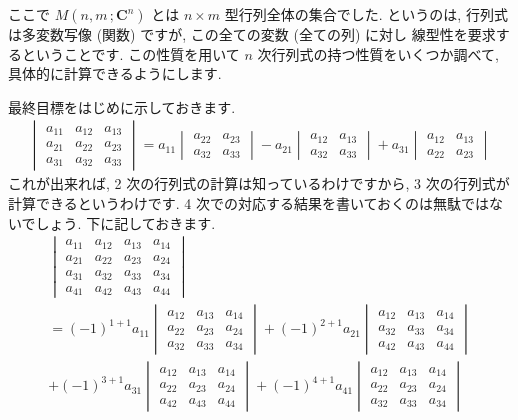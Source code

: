 \documentclass[openany, a4paper, oneside]{book}
\theoremstyle{break}
\theoremstyle{breakdefn}
\begin{document}
ここで $M \left ( n,m \, ; \bm{C}^n \right)$ とは $n \times m$ 型行列全体の集合でした.
というのは,
行列式は多変数写像 (関数) ですが, この全ての変数 (全ての列) に対し
線型性を要求するということです.
この性質を用いて $n$ 次行列式の持つ性質をいくつか調べて, 具体的に計算できるようにします.

最終目標をはじめに示しておきます.
\begin{align}
 \begin{vmatrix} a_{11} & a_{12} & a_{13} \\
  a_{21} & a_{22} & a_{23} \\
  a_{31} & a_{32} & a_{33}
 \end{vmatrix}
 =
 a_{11}
 \begin{vmatrix} a_{22} & a_{23} \\
  a_{32} & a_{33}
 \end{vmatrix}
 -a_{21}
 \begin{vmatrix}
  a_{12} & a_{13} \\
  a_{32} & a_{33}
 \end{vmatrix}
 +a_{31}
 \begin{vmatrix}
  a_{12} & a_{13} \\
  a_{22} & a_{23}
 \end{vmatrix}
\end{align}
これが出来れば, 2 次の行列式の計算は知っているわけですから, 3 次の行列式が計算できるというわけです.
4 次での対応する結果を書いておくのは無駄ではないでしょう. 下に記しておきます.
\begin{gather}
 \begin{vmatrix} a_{11} & a_{12} & a_{13} & a_{14} \\
 a_{21} & a_{22} & a_{23} & a_{24} \\
 a_{31} & a_{32} & a_{33} & a_{34} \\
 a_{41} & a_{42} & a_{43} & a_{44}
 \end{vmatrix}\\
 =
 (-1)^{1+1}a_{11}
 \begin{vmatrix} a_{12} & a_{13} & a_{14} \\
 a_{22} & a_{23} & a_{24} \\
 a_{32} & a_{33} & a_{34}
 \end{vmatrix}
 +(-1)^{2+1}a_{21}
 \begin{vmatrix}
 a_{12} & a_{13} & a_{14} \\
 a_{32} & a_{33} & a_{34} \\
 a_{42} & a_{43} & a_{44}
 \end{vmatrix} \\
 +(-1)^{3+1}a_{31}
 \begin{vmatrix}
 a_{12} & a_{13} & a_{14} \\
 a_{22} & a_{23} & a_{24} \\
 a_{42} & a_{43} & a_{44}
 \end{vmatrix}
 +(-1)^{4+1}a_{41}
 \begin{vmatrix} a_{12} & a_{13} & a_{14} \\
 a_{22} & a_{23} & a_{24} \\
 a_{32} & a_{33} & a_{34}
 \end{vmatrix}
\end{gather}
\end{document}
